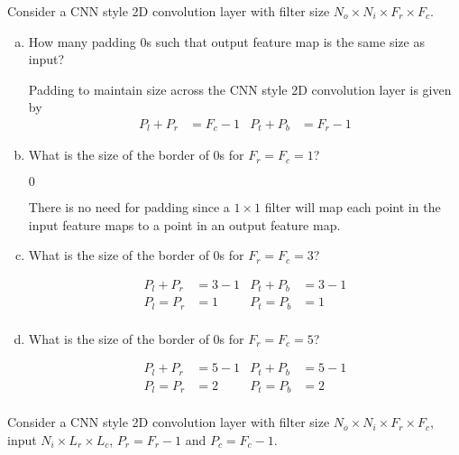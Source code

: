 \documentclass[11pt]{article}
\begin{document}
Consider a CNN style 2D convolution layer with filter size $N_o \times N_i
\times F_r \times F_c$.
\begin{enumerate}[(a)]\itemsep0pt
	\item How many padding $0$s such that output feature map is the same size
		as input?
		\begin{solution}

			Padding to maintain size across the CNN style 2D convolution layer
			is given by
			\begin{align}
				P_l+P_r&=F_c-1 & P_t+P_b&=F_r-1
			\end{align}
		\end{solution}
	\item What is the size of the border of $0$s for $F_r=F_c=1$?
		\begin{solution}
			$0$

			There is no need for padding since a $1\times1$ filter will map
			each point in the input feature maps to a point in an output
			feature map.
		\end{solution}
	\item What is the size of the border of $0$s for $F_r=F_c=3$?
		\begin{solution}
			\begin{align}
				P_l+P_r&=3-1 & P_t+P_b&=3-1 \\
				P_l=P_r&=1 & P_t=P_b&=1 \\
			\end{align}
		\end{solution}
	\item What is the size of the border of $0$s for $F_r=F_c=5$?
		\begin{solution}
			\begin{align}
				P_l+P_r&=5-1 & P_t+P_b&=5-1 \\
				P_l=P_r&=2 & P_t=P_b&=2 \\
			\end{align}
		\end{solution}
\end{enumerate}

Consider a CNN style 2D convolution layer with filter size $N_o \times N_i
\times F_r \times F_c$, input $N_i \times L_r \times L_c$, $P_r = F_r-1$ and
$P_c=F_c-1$.
\end{document}
